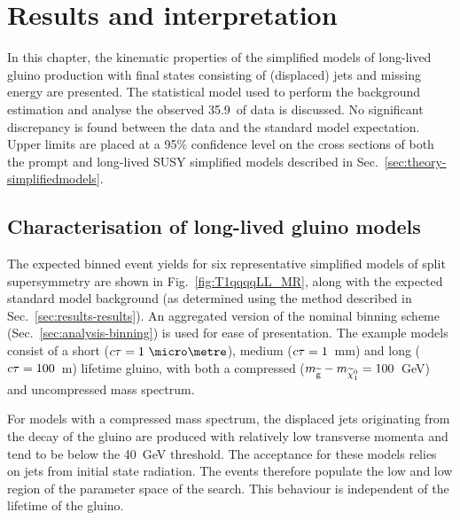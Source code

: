 \chapter{Results and interpretation}
\label{chap:results}


In this chapter, the kinematic properties of the simplified models of 
long-lived gluino production with final states consisting of (displaced) jets 
and missing energy are presented. The statistical model used to perform the 
background estimation and analyse the observed 35.9~\ifb of data is discussed. 
No significant discrepancy is found between the data and the standard model 
expectation. Upper limits are placed at a 95\% confidence level on the cross 
sections of both the prompt and long-lived SUSY simplified models described in 
Sec.~\ref{sec:theory-simplifiedmodels}. 


\section{Characterisation of long-lived gluino models}

The expected binned event yields for six representative simplified models of 
split supersymmetry are shown in Fig.~\ref{fig:T1qqqqLL_MR}, along with the 
expected 
standard model background (as determined using the method described in 
Sec.~\ref{sec:results-results}). An aggregated version of the nominal binning 
scheme (Sec.~\ref{sec:analysis-binning}) is used for ease of presentation. The 
example models consist of a short ($\ctau=1~\micro\metre$), medium 
($c\tau=1$~mm) and long ($c\tau=100$~m) lifetime gluino, with both a compressed 
($m_{\mathrm{\widetilde{g}}} - m_{\widetilde{\chi}_1^0} = 100$~GeV) and uncompressed mass spectrum.

For models with a compressed mass spectrum, the displaced jets originating from 
the decay of the gluino are produced with relatively low transverse momenta and 
tend to be below the 40~GeV threshold. The acceptance for these models relies 
on jets from initial state radiation. The events therefore populate the low 
\njet and low \scalht region of the parameter space of the search. This 
behaviour is independent of the lifetime of the gluino.


